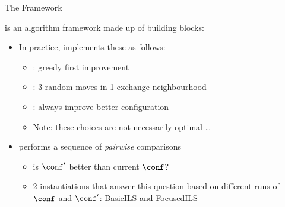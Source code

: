 \begin{frame}[c,fragile]{The \paramils{} Framework}

\paramils{} is an algorithm framework made up of building blocks:

\begin{itemize}
\item In practice, \paramils{} implements these as follows:
\begin{itemize}
\item {}: greedy first improvement
\item {}: 3 random moves in 1-exchange neighbourhood
\item {}: always improve better configuration
\item Note: these choices are not necessarily optimal \ldots
\end{itemize}

\pause
\bigskip

\item \paramils{} performs a sequence of \emph{pairwise} comparisons
\begin{itemize}
\item \alert{is $\conf'$ better than current $\conf$}?
\item 2 instantiations that answer this question based on different runs of $\conf$ and $\conf'$: \alert{BasicILS} and \alert{FocusedILS}
\end{itemize}   
\end{itemize}


\end{frame}



